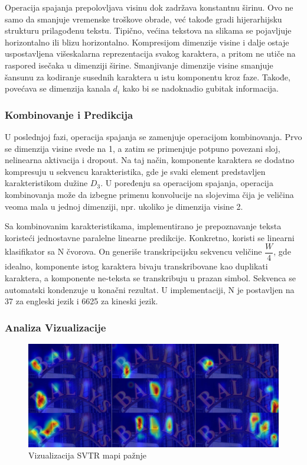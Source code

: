 \documentclass[a4paper,12pt]{article}
\begin{document}
	Operacija spajanja prepolovljava visinu dok zadržava konstantnu širinu. Ovo ne samo da smanjuje vremenske troškove obrade, već takođe gradi hijerarhijsku strukturu prilagođenu tekstu. Tipično, većina tekstova na slikama se pojavljuje horizontalno ili blizu horizontalno. Kompresijom dimenzije visine i dalje ostaje uspostavljena višeskalarna reprezentacija svakog karaktera, a pritom ne utiče na raspored isečaka u dimenziji širine. Smanjivanje dimenzije visine smanjuje šansunu za kodiranje susednih karaktera u istu komponentu kroz faze. Takođe, povećava se dimenzija kanala \(d_i\) kako bi se nadoknadio gubitak informacija.
	
	\subsubsection{Kombinovanje i Predikcija}
	U poslednjoj fazi, operacija spajanja se zamenjuje operacijom kombinovanja. Prvo se dimenzija visine svede na 1, a zatim se primenjuje potpuno povezani sloj, nelinearna aktivacija i dropout. Na taj način, komponente karaktera se dodatno kompresuju u sekvencu karakteristika, gde je svaki element predstavljen karakteristikom dužine \(D_3\). U poređenju sa operacijom spajanja, operacija kombinovanja može da izbegne primenu konvolucije na slojevima čija je veličina veoma mala u jednoj dimenziji, npr. ukoliko je dimenzija visine 2.
	
	Sa kombinovanim karakteristikama, implementirano je prepoznavanje teksta koristeći jednostavne paralelne linearne predikcije. Konkretno, koristi se linearni klasifikator sa N čvorova. On generiše transkripcijsku sekvencu veličine \(\dfrac{W}{4}\), gde idealno, komponente istog karaktera bivaju transkribovane kao duplikati karaktera, a komponente ne-teksta se transkribuju u prazan simbol. Sekvenca se automatski kondenzuje u konačni rezultat. U implementaciji, N je postavljen na 37 za engleski jezik i 6625 za kineski jezik.
	
	\subsubsection{Analiza Vizualizacije}
	\begin{figure}[H]
		\centering
		\includegraphics[width=\textwidth]{assets/visualization-of-svtr-attention-maps.png}
		\caption{Vizualizacija SVTR mapi pažnje}
		\label{fig:visualization-of-svtr-attention-maps}
	\end{figure}
	
\end{document}
